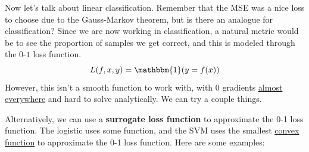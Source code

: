 Now let's talk about linear classification. Remember that the MSE was a nice loss to choose due to the Gauss-Markov theorem, but is there an analogue for classification? Since we are now working in classification, a natural metric would be to see the proportion of samples we get correct, and this is modeled through the $0$-$1$ loss function. 
\begin{equation}
  L(f, x, y) = \mathbbm{1}(y = f(x))
\end{equation} 
However, this isn't a smooth function to work with, with $0$ gradients \hyperref[mt-def:almost_everywhere]{almost everywhere} and hard to solve analytically. We can try a couple things. 

Alternatively, we can use a \textbf{surrogate loss function} to approximate the 0-1 loss function. The logistic uses some function, and the SVM uses the smallest \hyperref[mt-def:convex-function]{convex function} to approximate the 0-1 loss function. Here are some examples: 

